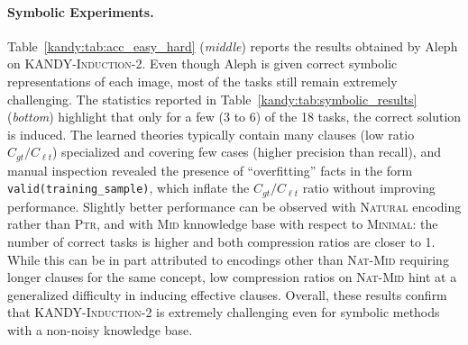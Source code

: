 \paragraph{Symbolic Experiments.}

%
Table~\ref{kandy:tab:acc_easy_hard} ({\it middle}) reports the results obtained by Aleph on \textsc{KANDY-Induction-2}. Even though Aleph is given correct symbolic representations of each image, most of the tasks still remain extremely challenging. The statistics reported in Table~\ref{kandy:tab:symbolic_results} ({\it bottom}) highlight that only for a few (3 to 6) of the 18 tasks, the correct solution is induced. The learned theories typically contain many clauses (low ratio $C_{gt} / C_{\ell t}$) specialized and covering few cases (higher precision than recall), and manual inspection revealed the presence of ``overfitting'' facts in the form \texttt{valid(training\_sample)}, which inflate the $C_{gt} / C_{\ell t}$ ratio without improving performance. Slightly better performance can be observed with \textsc{Natural} encoding rather than \textsc{Ptr}, and with \textsc{Mid} knnowledge base with respect to \textsc{Minimal}: the number of correct tasks is higher and both compression ratios are closer to 1. 
While this can be in part attributed to encodings other than \textsc{Nat-Mid} requiring longer clauses for the same concept, low compression ratios on \textsc{Nat-Mid} hint at a generalized difficulty in inducing effective clauses. Overall, these results confirm that \textsc{KANDY-Induction-2} is extremely challenging even for symbolic methods with a non-noisy knowledge base. %

%





